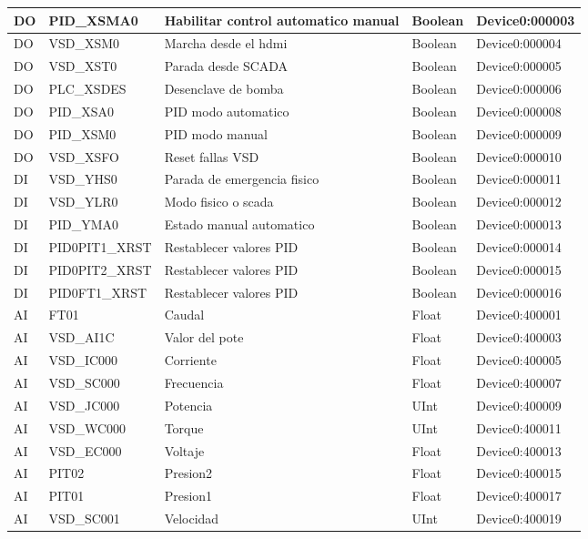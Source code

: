 \begin{longtable}{|p{1.2cm} |p{4cm} |p{4cm} |p{1.5cm} |p{3.2cm} |}
	\endlastfoot
	

	DO & PID\_XSMA0 & Habilitar control automatico manual & Boolean & Device0:000003 \\ \hline
	DO & VSD\_XSM0 & Marcha desde el hdmi & Boolean & Device0:000004 \\ \hline
	DO & VSD\_XST0 & Parada desde SCADA & Boolean & Device0:000005 \\ \hline
	DO & PLC\_XSDES & Desenclave de bomba & Boolean & Device0:000006 \\ \hline
	DO & PID\_XSA0 & PID modo automatico & Boolean & Device0:000008 \\ \hline
	DO & PID\_XSM0 & PID modo manual & Boolean & Device0:000009 \\ \hline
	DO & VSD\_XSFO & Reset fallas VSD & Boolean & Device0:000010 \\ \hline
	DI & VSD\_YHS0 & Parada de emergencia fisico & Boolean & Device0:000011 \\ \hline
	DI & VSD\_YLR0 & Modo fisico o scada & Boolean & Device0:000012 \\ \hline
	DI & PID\_YMA0 & Estado manual automatico & Boolean & Device0:000013 \\ \hline
	DI & PID0PIT1\_XRST & Restablecer valores PID & Boolean & Device0:000014 \\ \hline
	DI & PID0PIT2\_XRST & Restablecer valores PID & Boolean & Device0:000015 \\ \hline
	DI & PID0FT1\_XRST & Restablecer valores PID& Boolean & Device0:000016 \\ \hline
	AI & FT01 & Caudal & Float & Device0:400001 \\ \hline
	AI & VSD\_AI1C & Valor del pote & Float & Device0:400003 \\ \hline
	AI & VSD\_IC000 & Corriente & Float & Device0:400005 \\ \hline
	AI & VSD\_SC000 & Frecuencia & Float & Device0:400007 \\ \hline
	AI & VSD\_JC000 & Potencia & UInt & Device0:400009 \\ \hline
	AI & VSD\_WC000 & Torque & UInt & Device0:400011 \\ \hline
	AI & VSD\_EC000 & Voltaje & Float & Device0:400013 \\ \hline
	AI & PIT02 & Presion2 & Float & Device0:400015 \\ \hline
	AI & PIT01 & Presion1 & Float & Device0:400017 \\ \hline
	AI & VSD\_SC001 & Velocidad & UInt & Device0:400019 \\ \hline

\end{longtable}
